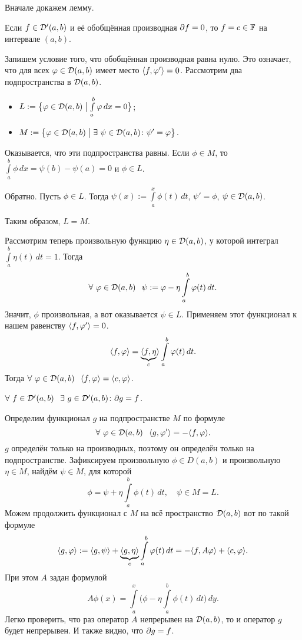Вначале докажем лемму.
\begin{Lem}
 Если $f\in\mathcal D'(a,b)$ и её обобщённая производная $\partial f = 0$, то $f=c\in\mathbb F$ на интервале $(a,b)$.
\end{Lem}
\begin{Proof}
  Запишем условие того, что обобщённая производная равна нулю. Это означает, что для всех $\varphi\in \mathcal D(a,b)$ имеет место $\langle f,\varphi'\rangle=0$. Рассмотрим два подпространства в $\mathcal D(a,b)$.
\begin{itemize}
\item $L:=\big\{\varphi\in\mathcal D(a,b)\bigm|\int\limits_{a}^b\varphi\,dx=0\big\}$;
\item $M:=\big\{\phi\in\D(a,b)\bigm|\exists\ \psi\in\D(a,b)\colon \psi'=\phi\big\}$.
\end{itemize}
Оказывается, что эти подпространства равны. Если $\phi\in M$, то $\int\limits_a^b\phi\,dx = \psi(b)-\psi(a) = 0$ и $\phi\in L$.

Обратно. Пусть $\phi\in L$. Тогда $\psi(x):=\int\limits_a^x\phi(t)\,dt$, $\psi'=\phi$, $\psi\in\mathcal D(a,b)$.

Таким образом, $L=M$.

Рассмотрим теперь произвольную функцию $\eta\in\mathcal D(a,b)$, у которой интеграл $\int\limits_a^b \eta(t)\,dt = 1$. Тогда
\[
  \forall\ \varphi\in\mathcal D(a,b)\hskip .75em plus.1em minus.08em\relax \psi := \varphi -\eta\int\limits_a^b\varphi(t)\,dt.
\]
Значит, $\phi$ произвольная, а вот оказывается $\psi\in L$. Применяем этот функционал к нашем равенству $\langle f,\varphi'\rangle=0$.
\[
  \langle f,\varphi\rangle = \underbrace{\langle f,\eta}_{c}\rangle\int\limits_a^b\varphi(t)\,dt.
\]
Тогда $\forall\ \phi\in\D(a, b)\pau \la f,\phi\ra = \la c,\phi\ra$.
\end{Proof}

\begin{The}
  $\forall\ f\in\D'(a,b)\pau\exists\ g\in \D'(a,b)\colon \dl g=f$.
\end{The}
\begin{Proof}
  Определим функционал $g$ на подпространстве $M$ по формуле
\[
  \forall\ \varphi\in \mathcal D(a,b)\hskip .75em plus.1em minus.08em\relax \langle g,\varphi'\rangle = -\langle f,\varphi\rangle.
\]
$g$ определён только на производных, поэтому он определён только на подпространстве. Зафиксируем произвольную $\phi\in D(a,b)$ и произвольную $\eta\in M$, найдём $\psi\in M$, для которой
\[
  \phi = \psi +\eta\int\limits_a^b\phi(t)\,dt,\quad \psi\in M=L.
\]
Можем продолжить функционал с $M$ на всё пространство $\mathcal D(a,b)$ вот по такой формуле
\[
  \langle g,\varphi\rangle := \langle g,\psi\rangle + \underbrace{\langle g,\eta\rangle}_{c}\int\limits_a^b\varphi(t)\,dt = -\langle f,A\varphi\rangle + \langle c,\varphi\rangle.
\]
При этом $A$ задан формулой
\[
  A\phi(x) = \int\limits_a^x\bigg(\phi-\eta\int\limits_a^b\phi(t)\,dt\bigg)\,dy.
\]
Легко проверить, что раз оператор $A$ непрерывен на $\mathcal D(a,b)$, то и оператор $g$ будет непрерывен. И также видно, что $\partial g=f$.
\end{Proof}
